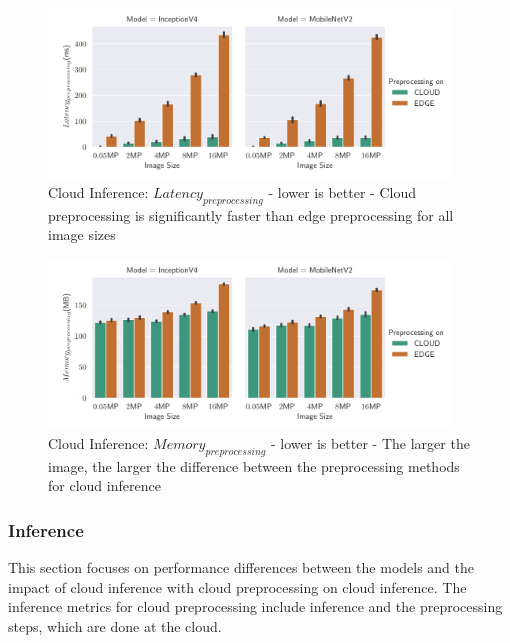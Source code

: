 \begin{figure}[!htb]
\centering
\includegraphics[width=0.95\textwidth]{./Bilder/single_plots/cloud_inference_plots/Cloud_Inference_Preprocessing_Latency.pdf}
\caption[Cloud Inference:  $Latency_{preprocessing}$ - lower is better]{Cloud Inference:  $Latency_{preprocessing}$ - lower is better - Cloud preprocessing is significantly faster than edge preprocessing for all image sizes}
\label{fig:cloudInferencePreproLat}
\end{figure}

\begin{figure}[!htb]
\centering
\includegraphics[width=0.95\textwidth]{./Bilder/single_plots/cloud_inference_plots/Cloud_Inference_Preprocessing_Memory.pdf}
\caption[Cloud Inference:  $Memory_{preprocessing}$ - lower is better]{Cloud Inference:  $Memory_{preprocessing}$ - lower is better - The larger the image, the larger the difference between the preprocessing methods for cloud inference}
\label{fig:cloudInferencePreproMemory}
\end{figure}

\FloatBarrier
\subsubsection{Inference}
This section focuses on performance differences between the models and the impact of cloud inference with cloud preprocessing on cloud inference.
The inference metrics for cloud preprocessing include inference and the preprocessing steps, which are done at the cloud.

